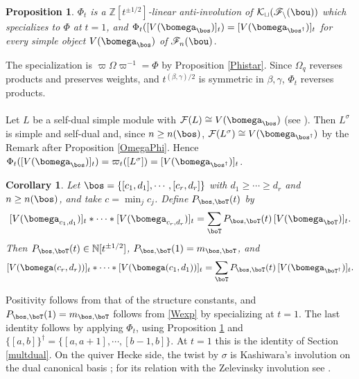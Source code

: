 \documentclass[11pt,reqno]{amsart}
\newtheorem*{cor}{Corollary}%
\newtheorem*{prop}{Proposition}
\theoremstyle{definition} \newtheorem*{defn}{Definition}
\theoremstyle{definition}
\newenvironment{pf}{\proof}{\endproof}
\numberwithin{equation}{section}
\begin{document}
\begin{prop}\label{Phit} $\Phi_t$ is a $\mathbb Z[t^{\pm1/2}]$-linear anti-involution of $\cal K_t(\mathscr F_n(\bou))$ which
specializes to $\Phi$ at $t=1$, and $\Phi_t([V(\bomega_\bos)]_t)=[V(\bomega_{\bos^\dagger})]_t$ for every simple object
$V(\bomega_\bos)$ of $\mathscr F_n(\bou)$.
\end{prop}
\begin{pf} The specialization is $\varpi\Omega\varpi^{-1}=\Phi$ by Proposition \ref{Phistar}. Since $\Omega_q$ reverses products
and preserves weights, and $t^{(\beta,\gamma)/2}$ is symmetric in $\beta,\gamma$, $\Phi_t$ reverses products.\\\\
Let $L$ be a
self-dual simple module with $\mathcal F(L)\cong V(\bomega_\bos)$ (see \cite{KL09}). Then $L^\sigma$ is simple and self-dual
 and, since $n\ge n(\bos)$,
$\mathcal F(L^\sigma)\cong V(\bomega_{\bos^\dagger})$ by the Remark after Proposition \ref{OmegaPhi}. Hence
$\Phi_t([V(\bomega_\bos)]_t)=\varpi_t([L^\sigma])=[V(\bomega_{\bos^\dagger})]_t$.
\end{pf}
\begin{cor}\label{multdualt} Let $\bos=\{[c_1,d_1],\cdots,[c_r,d_r]\}$ with $d_1\ge\cdots\ge d_r$ and $n\ge n(\bos)$, and take
$c=\min_jc_j$. Define $P_{\bos,\boT}(t)$ by
$$[V(\bomega_{c_1,d_1})]_t*\cdots*[V(\bomega_{c_r,d_r})]_t=\sum_\boT P_{\bos,\boT}(t)\,[V(\bomega_\boT)]_t.$$
Then $P_{\bos,\boT}(t)\in\mathbb N[t^{\pm1/2}]$, $P_{\bos,\boT}(1)=m_{\bos,\boT}$, and
$$[V(\bomega(c_r,d_r))]_t*\cdots*[V(\bomega(c_1,d_1))]_t=\sum_\boT P_{\bos,\boT}(t)\,[V(\bomega_{\boT^\dagger})]_t.$$
\end{cor}
\begin{pf} Positivity follows from that of the structure constants, and $P_{\bos,\boT}(1)=m_{\bos,\boT}$ follows from
\eqref{Wexp} by specializing at $t=1$. The last identity follows by applying $\Phi_t$, using Proposition \ref{Phit} and
$\{[a,b]\}^\dagger=\{[a,a+1],\cdots,[b-1,b]\}$.
\end{pf}
\noindent At $t=1$ this is the identity of Section \ref{multdual}. On the quiver Hecke side, the twist by $\sigma$ is Kashiwara's
involution on the dual canonical basis \cite{KL09,LV11}; for its relation with the Zelevinsky involution see \cite{LTV99,JL10}.
\end{document}
